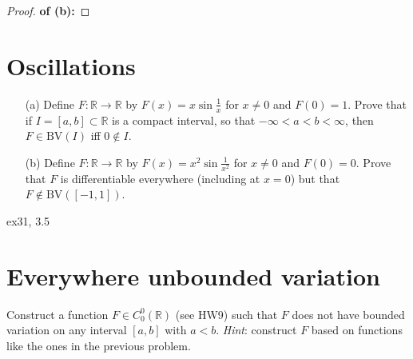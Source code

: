 \documentclass[lang=cn,11pt]{elegantbook}
\begin{document}
\begin{proof}
    \textbf{of (b):}
    
\end{proof}




\section{Oscillations}
  \begin{itemize}
  \item[(a)] Define $F\colon \mathbb{R} \to \mathbb{R}$ by $F(x)=x\sin\frac1{x}$ for $x\ne 0$ and $F(0)=1$. Prove that if $I=[a,b]\subset \mathbb{R}$ is a compact interval, so that $-\infty<a<b<\infty$, then $F\in\mathrm{BV}(I)$ iff $0\not\in I$.
  \item[(b)]Define $F\colon\mathbb{R} \to \mathbb{R}$ by $F(x)=x^2\sin\frac1{x^2}$ for $x\ne 0$ and $F(0)=0$. Prove that $F$ is differentiable everywhere (including at $x=0$) but that $F\not\in\mathrm{BV}([-1,1])$.
  \end{itemize}

ex31, 3.5







\section{Everywhere unbounded variation}
  Construct a function $F\in C^0_0(\mathbb{R})$ (see HW9) such that $F$ does not have bounded variation on any interval $[a,b]$ with $a<b$.
  \textit{Hint}: construct $F$ based on functions like the ones in the previous problem.
\end{document}

